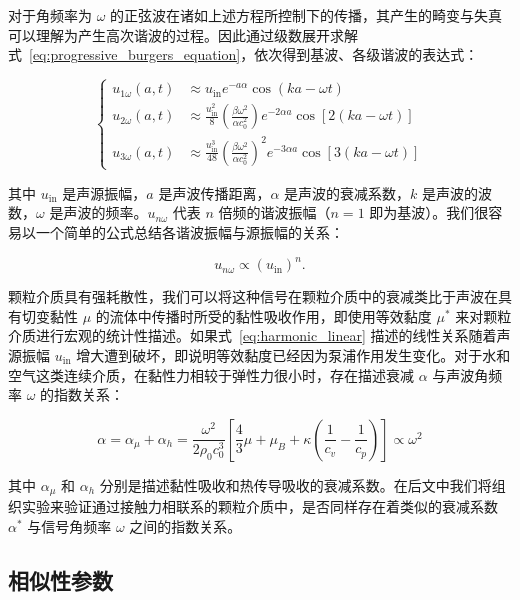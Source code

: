 对于角频率为 $\omega$ 的正弦波在诸如上述方程所控制下的传播，其产生的畸变与失真可以理解为产生高次谐波的过程。因此通过级数展开求解式~\eqref{eq:progressive_burgers_equation}，依次得到基波、各级谐波的表达式：

\begin{equation}
  \begin{cases}
    u_{1\omega}(a,t) &\approx u_{\text{in}}e^{-a\alpha}\cos{(ka-\omega t)}\\
    u_{2\omega}(a,t) &\approx \frac{u_{\text{in}}^{2}}{8}\left(\frac{\beta\omega^{2}}{\alpha c_{0}^{2}}\right)e^{-2\alpha a}\cos{[2(ka-\omega t)]}\\
    u_{3\omega}(a,t) &\approx \frac{u_{\text{in}}^{3}}{48}\left(\frac{\beta\omega^{2}}{\alpha c_{0}^{2}}\right)^{2}e^{-3\alpha a}\cos{[3(ka-\omega t)]}
    \end{cases}
\end{equation}

其中 $u_{\text{in}}$ 是声源振幅，$a$ 是声波传播距离，$\alpha$ 是声波的衰减系数，$k$ 是声波的波数，$\omega$ 是声波的频率。$u_{n\omega}$ 代表 $n$ 倍频的谐波振幅（$n=1$ 即为基波）。我们很容易以一个简单的公式总结各谐波振幅与源振幅的关系：

\begin{equation}
  u_{n\omega} \propto \left(u_{\text{in}}\right)^{n}.\label{eq:harmonic_linear}
\end{equation}

颗粒介质具有强耗散性，我们可以将这种信号在颗粒介质中的衰减类比于声波在具有切变黏性 $\mu$ 的流体中传播时所受的黏性吸收作用，即使用等效黏度 $\mu^{*}$ 来对颗粒介质进行宏观的统计性描述。如果式~\eqref{eq:harmonic_linear} 描述的线性关系随着声源振幅 $u_{\text{in}}$ 增大遭到破坏，即说明等效黏度已经因为泵浦作用发生变化。对于水和空气这类连续介质，在黏性力相较于弹性力很小时，存在描述衰减 $\alpha$ 与声波角频率 $\omega$ 的指数关系：

\begin{equation}
  \alpha = \alpha_{\mu} + \alpha_{h} = \frac{\omega^{2}}{2\rho_{0}c_{0}^{3}}\left[\frac{4}{3}\mu + \mu_{B} + \kappa\left(\frac{1}{c_{v}} - \frac{1}{c_{p}}\right)\right]\propto \omega^{2}
\end{equation}

其中 $\alpha_{\mu}$ 和 $\alpha_{h}$ 分别是描述黏性吸收和热传导吸收的衰减系数。在后文中我们将组织实验来验证通过接触力相联系的颗粒介质中，是否同样存在着类似的衰减系数 $\alpha^{*}$ 与信号角频率 $\omega$ 之间的指数关系。

\subsection{相似性参数}

